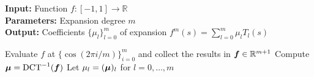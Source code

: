 \hspace*{\algorithmicindent} \textbf{Input:} Function $f:[-1, 1] \to \mathbb{R}$ \\%
\hspace*{\algorithmicindent} \textbf{Parameters:} Expansion degree $m$ \\
\hspace*{\algorithmicindent} \textbf{Output:} Coefficients $\{ \mu_l \}_{l=0}^m$ of expansion $f^m(s) = \sum_{l=0}^m \mu_l T_l(s)$
\begin{algorithmic}[1]
    \State Evaluate $f$ at $\{\cos(2\pi i / m)\}_{i=0}^m$ and collect the results in $\boldsymbol{f}\in \mathbb{R}^{m+1}$
    \State Compute $\boldsymbol{\mu} = \operatorname{DCT}^{-1}(\boldsymbol{f})$
    \State Let $\mu_l = (\boldsymbol{\mu})_l$ for $l=0,\dots,m$
\end{algorithmic}
